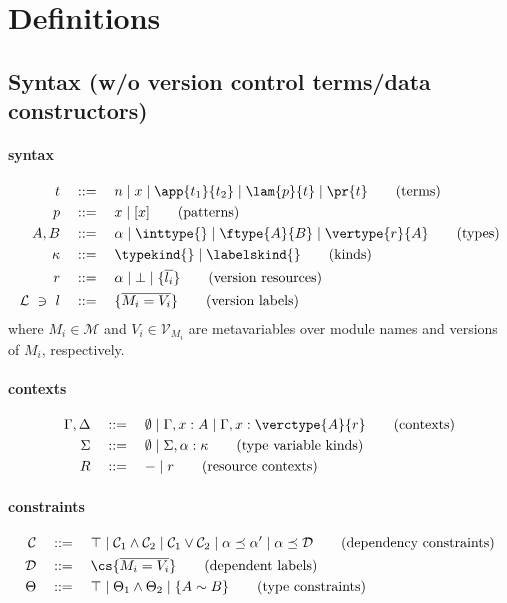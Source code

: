 \section{\vlmini{} Definitions}

\subsection{\vlmini{} Syntax (w/o version control terms/data constructors)}

\paragraph{\textnormal{\textbf{\vlmini{} syntax}}}
\begin{align*}
t \quad&::=\quad n \mid x \mid \app{t_1}{t_2} \mid \lam{p}{t} \mid \pr{t} \tag{terms}\\
p \quad&::=\quad x \mid [x] \tag{patterns}\\
A, B \quad&::=\quad \alpha \mid \inttype{} \mid \ftype{A}{B} \mid \vertype{r}{A} \tag{types}\\
\kappa \quad&::=\quad \typekind{} \mid \labelskind{} \tag{kinds}\\
r      \quad&::=\quad \alpha \mid  \bot \mid \{\overline{l_i}\} \tag{version resources}\\
\mathcal{L}\ \ni\ l\quad&::=\quad \{\overline{M_i = V_i}\} \tag{version labels}
\end{align*}
where $M_i\in\mathcal{M}$ and $V_i\in\mathcal{V}_{M_i}$ are metavariables over module names and versions of $M_i$, respectively.

\paragraph{\textnormal{\textbf{\vlmini{} contexts}}}
\begin{align*}
\Gamma,\Delta \quad&::=\quad \emptyset \mid \Gamma, x:A \mid \Gamma, x:\verctype{A}{r} \tag{contexts}\\
\Sigma \quad&::=\quad \emptyset \mid \Sigma, \alpha:\kappa \tag{type variable kinds}\\
R      \quad&::=\quad - \mid r \tag{resource contexts}
\end{align*}

\paragraph{\textnormal{\textbf{\vlmini{} constraints}}}
\begin{align*}
\mathcal{C} \quad&::=\quad \top \mid \mathcal{C}_1 \land \mathcal{C}_2 \mid \mathcal{C}_1 \lor \mathcal{C}_2 \mid \alpha \preceq \alpha' \mid \alpha \preceq \mathcal{D} \tag{dependency constraints}\\
\mathcal{D} \quad&::=\quad \cs{\overline{M_i = V_i}} \tag{dependent labels}\\
\Theta      \quad&::=\quad \top \mid \Theta_1 \land \Theta_2 \mid \{A \sim B\} \tag{type constraints}
\end{align*}


